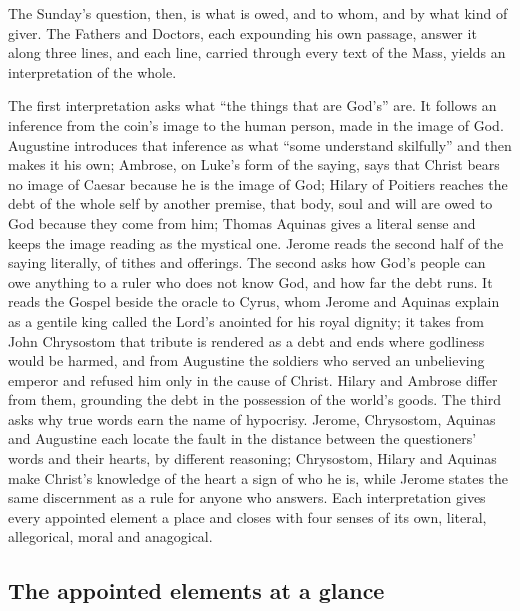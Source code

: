 The Sunday's question, then, is what is owed, and to whom, and by what kind of
giver. The Fathers and Doctors, each expounding his own passage, answer it
along three lines, and each line, carried through every text of the Mass,
yields an interpretation of the whole.

The first interpretation asks what ``the things that are God's'' are. It
follows an inference from the coin's image to the human person, made in the
image of God. Augustine introduces that inference as what ``some understand
skilfully'' and then makes it his own; Ambrose, on Luke's form of the saying,
says that Christ bears no image of Caesar because he is the image of God;
Hilary of Poitiers reaches the debt of the whole self by another premise, that
body, soul and will are owed to God because they come from him; Thomas Aquinas
gives a literal sense and keeps the image reading as the mystical one. Jerome
reads the second half of the saying literally, of tithes and offerings. The
second asks how God's people can owe
anything to a ruler who does not know God, and how far the debt runs. It reads
the Gospel beside the oracle to Cyrus, whom Jerome and Aquinas explain as a
gentile king called the Lord's anointed for his royal dignity; it takes
from John Chrysostom that tribute is rendered as a debt and ends where
godliness would be harmed, and from Augustine the soldiers who served an
unbelieving emperor and refused him only in the cause of Christ. Hilary and
Ambrose differ from them, grounding the debt in the possession of the world's
goods. The third asks why true words earn the name of
hypocrisy. Jerome, Chrysostom, Aquinas and Augustine each locate the fault in
the distance between the questioners' words and their hearts, by different
reasoning; Chrysostom, Hilary and Aquinas make Christ's knowledge of the heart
a sign of who he is, while Jerome states the same discernment as a rule for
anyone who answers. Each interpretation gives every appointed element a place
and closes with four senses of its own, literal, allegorical, moral and
anagogical.

\subsection{The appointed elements at a glance}

